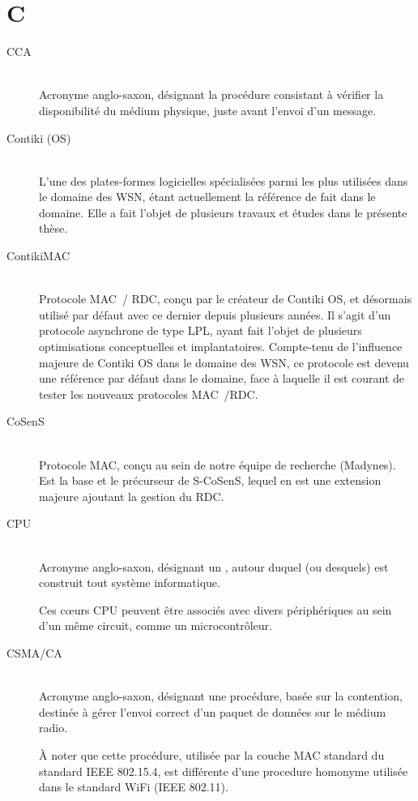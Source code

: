 
\section*{C}

\begin{description}

\item[CCA]  \\
Acronyme anglo-saxon, désignant la procédure consistant à vérifier la
disponibilité du médium physique, juste avant l'envoi d'un message.

\item[Contiki (OS)] \ \\
L'une des plates-formes logicielles spécialisées parmi les plus utilisées
dans le domaine des WSN, étant actuellement la référence de fait dans le
domaine. Elle a fait l'objet de plusieurs travaux et études
dans le présente thèse.

\item[ContikiMAC] \ \\
Protocole MAC~/ RDC, conçu par le créateur de Contiki OS, et désormais
utilisé par défaut avec ce dernier depuis plusieurs années. Il s'agit
d'un protocole asynchrone de type LPL, ayant fait l'objet de plusieurs
optimisations conceptuelles et implantatoires. Compte-tenu de l'influence
majeure de Contiki OS dans le domaine des WSN, ce protocole est devenu une
référence par défaut dans le domaine, face à laquelle il est courant de
tester les nouveaux protocoles MAC~/RDC.

\item[CoSenS] \ \\
Protocole MAC, conçu au sein de notre équipe de recherche (Madynes).
Est la base et le précurseur de S-CoSenS, lequel en est une extension
majeure ajoutant la gestion du RDC.

\item[CPU]  \\
Acronyme anglo-saxon, désignant un ,
autour duquel (ou desquels) est construit tout système informatique.

Ces c{\oe}urs CPU peuvent être associés avec divers périphériques au
sein d'un même circuit, comme un microcontrôleur.

\item[CSMA/CA]  \\
Acronyme anglo-saxon, désignant une procédure, basée sur la contention,
destinée à gérer l'envoi correct d'un paquet de données sur le médium
radio.

À noter que cette procédure, utilisée par la couche MAC standard du
standard IEEE 802.15.4, est différente d'une procedure homonyme utilisée
dans le standard WiFi (IEEE 802.11).

\end{description}

